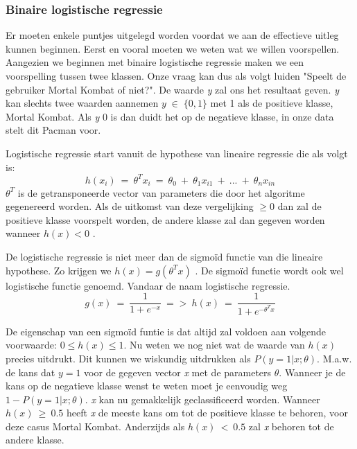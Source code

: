 \subsubsection{Binaire logistische regressie}
\label{sec:Binaire-logistische-regressie}

Er moeten enkele puntjes uitgelegd worden voordat we aan de effectieve uitleg kunnen beginnen. Eerst en vooral moeten we weten wat we willen voorspellen. Aangezien we beginnen met binaire logistische regressie maken we een voorspelling tussen twee klassen. Onze vraag kan dus als volgt luiden "Speelt de gebruiker Mortal Kombat of niet?". De waarde \textit{y} zal ons het resultaat geven. \textit{y} kan slechts twee waarden aannemen $y \; \in \; \{0,1\}$ met 1 als de positieve klasse, Mortal Kombat. Als \textit{y} 0 is dan duidt het op de negatieve klasse, in onze data stelt dit Pacman voor. 

Logistische regressie start vanuit de hypothese van lineaire regressie die als volgt is: 
$$
h(x_{i}) \:= \: \theta^{T}x_{i} \:=\: \theta_{0} \:+ \:\theta_{1}x_{i1} \:+ \: ...\: + \: \theta_{n}x_{in}
$$
$ \theta^{T}$ is de getransponeerde vector van parameters die door het algoritme gegenereerd worden. Als de uitkomst van deze vergelijking $\geq 0$ dan zal de positieve klasse voorspelt worden, de andere klasse zal dan gegeven worden wanneer $h(x) < 0$ . 

De logistische regressie is niet meer dan de sigmoïd functie van die lineaire hypothese. Zo krijgen we $h(x) = g(\theta^{T}x)$ . De sigmoïd functie wordt ook wel logistische functie genoemd. Vandaar de naam logistische regressie. 
$$
g(x) \: = \: {\frac{1}{1+e^{-x}}} \: => \: h(x) \: = \:{\frac{1}{1+e^{-\theta^{T}x }}}
$$



De eigenschap van een sigmoïd funtie is dat altijd zal voldoen aan volgende voorwaarde: $ 0 \leq h(x) \leq1$. 
Nu weten we nog niet wat de waarde van $h(x)$ precies uitdrukt. Dit kunnen we wiskundig uitdrukken als $P(y=1|x;\theta)$. M.a.w. de kans dat $y = 1$ voor de gegeven vector \textit{x} met de parameters $\theta$. Wanneer je de kans op de negatieve klasse wenst te weten moet je eenvoudig weg $1 - P(y=1|x;\theta)$. 
\textit{x} kan nu gemakkelijk geclassificeerd worden. Wanneer $h(x)\:\geq\:0.5$ heeft \textit{x} de meeste kans om tot de positieve klasse te behoren, voor deze casus Mortal Kombat. Anderzijds als $h(x)\:<\:0.5$ zal \textit{x} behoren tot de andere klasse. 

